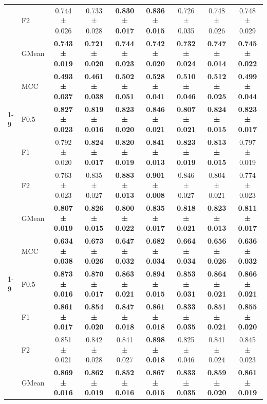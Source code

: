 \begin{table}[H]
{\begin{tabular}{llccccccc}
 & F2 & 0.744 ± 0.026 & 0.733 ± 0.028 & \textbf{0.830 ± 0.017} & \textbf{0.836 ± 0.015} & 0.726 ± 0.035 & 0.748 ± 0.026 & 0.748 ± 0.029 \\
 & GMean & \textbf{0.743 ± 0.019} & \textbf{0.721 ± 0.020} & \textbf{0.744 ± 0.023} & \textbf{0.742 ± 0.020} & \textbf{0.732 ± 0.024} & \textbf{0.747 ± 0.014} & \textbf{0.745 ± 0.022} \\
 & MCC & \textbf{0.493 ± 0.037} & \textbf{0.461 ± 0.038} & \textbf{0.502 ± 0.051} & \textbf{0.528 ± 0.041} & \textbf{0.510 ± 0.046} & \textbf{0.512 ± 0.025} & \textbf{0.499 ± 0.044} \\
\cline{1-9}
\multirow[t]{5}{*}{RandomForest} & F0.5 & \textbf{0.827 ± 0.023} & \textbf{0.819 ± 0.016} & \textbf{0.823 ± 0.020} & \textbf{0.846 ± 0.021} & \textbf{0.807 ± 0.021} & \textbf{0.824 ± 0.015} & \textbf{0.823 ± 0.017} \\
 & F1 & 0.792 ± 0.020 & \textbf{0.824 ± 0.017} & \textbf{0.820 ± 0.019} & \textbf{0.841 ± 0.013} & \textbf{0.823 ± 0.019} & \textbf{0.813 ± 0.015} & 0.797 ± 0.019 \\
 & F2 & 0.763 ± 0.023 & 0.835 ± 0.027 & \textbf{0.883 ± 0.013} & \textbf{0.901 ± 0.008} & 0.846 ± 0.027 & 0.804 ± 0.021 & 0.774 ± 0.023 \\
 & GMean & \textbf{0.807 ± 0.019} & \textbf{0.826 ± 0.015} & \textbf{0.800 ± 0.022} & \textbf{0.835 ± 0.017} & \textbf{0.818 ± 0.021} & \textbf{0.823 ± 0.013} & \textbf{0.811 ± 0.017} \\
 & MCC & \textbf{0.634 ± 0.038} & \textbf{0.673 ± 0.026} & \textbf{0.647 ± 0.032} & \textbf{0.682 ± 0.034} & \textbf{0.664 ± 0.034} & \textbf{0.656 ± 0.026} & \textbf{0.636 ± 0.032} \\
\cline{1-9}
\multirow[t]{5}{*}{TabM} & F0.5 & \textbf{0.873 ± 0.016} & \textbf{0.870 ± 0.017} & \textbf{0.863 ± 0.021} & \textbf{0.894 ± 0.015} & \textbf{0.853 ± 0.031} & \textbf{0.864 ± 0.021} & \textbf{0.866 ± 0.021} \\
 & F1 & \textbf{0.861 ± 0.017} & \textbf{0.854 ± 0.020} & \textbf{0.847 ± 0.018} & \textbf{0.861 ± 0.018} & \textbf{0.833 ± 0.035} & \textbf{0.851 ± 0.021} & \textbf{0.855 ± 0.020} \\
 & F2 & 0.851 ± 0.021 & 0.842 ± 0.028 & 0.841 ± 0.027 & \textbf{0.898 ± 0.018} & 0.825 ± 0.046 & 0.841 ± 0.024 & 0.845 ± 0.023 \\
 & GMean & \textbf{0.869 ± 0.016} & \textbf{0.862 ± 0.019} & \textbf{0.852 ± 0.016} & \textbf{0.867 ± 0.015} & \textbf{0.833 ± 0.035} & \textbf{0.859 ± 0.020} & \textbf{0.861 ± 0.019} \\

\end{tabular}}
\end{table}
